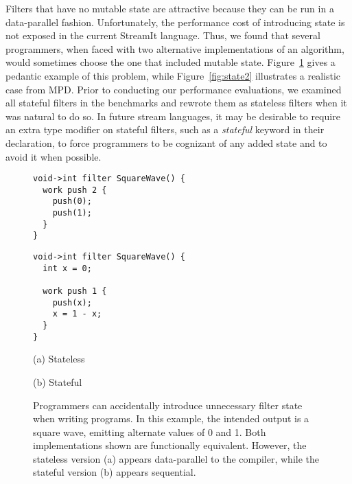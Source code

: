   Filters that have no mutable state are
  attractive because they can be run in a data-parallel fashion.
  Unfortunately, the performance cost of introducing state is not
  exposed in the current StreamIt language.  Thus, we found that
  several programmers, when faced with two alternative implementations
  of an algorithm, would sometimes choose the one that included
  mutable state.  Figure~\ref{fig:state} gives a pedantic example of
  this problem, while Figure~\ref{fig:state2} illustrates a realistic
  case from MPD.  Prior to conducting our performance evaluations, we
  examined all stateful filters in the benchmarks and rewrote them as
  stateless filters when it was natural to do so.  In future stream
  languages, it may be desirable to require an extra type modifier on
  stateful filters, such as a {\it stateful} keyword in their
  declaration, to force programmers to be cognizant of any added state
  and to avoid it when possible.

\begin{figure}[t]
\hspace{0.1\textwidth}
\begin{minipage}{0.35\textwidth}
\centering
\ninepoint
\begin{verbatim}
void->int filter SquareWave() {
  work push 2 {
    push(0);
    push(1);
  }
}
\end{verbatim}
\end{minipage}
\hspace{0.1\textwidth}
\begin{minipage}{0.35\textwidth}
\centering
\ninepoint
\begin{verbatim}
void->int filter SquareWave() {
  int x = 0;
 
  work push 1 {
    push(x);
    x = 1 - x;
  }
}
\end{verbatim}
\end{minipage}

\begin{minipage}{0.5\textwidth}
\centering
(a) Stateless
\end{minipage}
\begin{minipage}{0.5\textwidth}
\centering
(b) Stateful
\end{minipage}
\caption[Accidental introduction of filter state (pedantic example).]{Programmers 
  can accidentally introduce unnecessary filter state when writing
  programs.  In this example, the intended output is a square wave,
  emitting alternate values of 0 and 1.  Both implementations shown
  are functionally equivalent.  However, the stateless version (a)
  appears data-parallel to the compiler, while the stateful version
  (b) appears sequential.\protect\label{fig:state}}
\end{figure}

